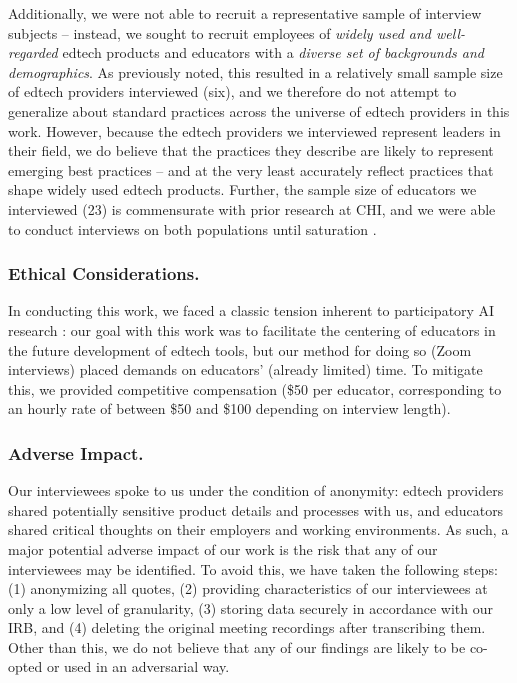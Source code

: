 Additionally, we were not able to recruit a representative sample of interview subjects -- instead, we sought to recruit employees of \textit{widely used and well-regarded} edtech products and educators with a \textit{diverse set of backgrounds and demographics}. As previously noted, this resulted in a relatively small sample size of edtech providers interviewed (six), and we therefore do not attempt to generalize about standard practices across the universe of edtech providers in this work. However, because the edtech providers we interviewed represent leaders in their field, we do believe that the practices they describe are likely to represent emerging best practices -- and at the very least accurately reflect practices that shape widely used edtech products. Further, the sample size of educators we interviewed (23) is commensurate with prior research at CHI, and we were able to conduct interviews on both populations until saturation \cite{hennink_sample_2022, small_2009_how}.

\subsubsection*{Ethical Considerations.}
In conducting this work, we faced a classic tension inherent to participatory AI research \cite{feffer_preference_2023, birhane_power_2022, sloane_participation_2022}: our goal with this work was to facilitate the centering of educators in the future development of edtech tools, but our method for doing so (Zoom interviews) placed demands on educators' (already limited) time. To mitigate this, we provided competitive compensation (\$50 per educator, corresponding to an hourly rate of between \$50 and \$100 depending on interview length).

\subsubsection*{Adverse Impact.}
Our interviewees spoke to us under the condition of anonymity: edtech providers shared potentially sensitive product details and processes with us, and educators shared critical thoughts on their employers and working environments. As such, a major potential adverse impact of our work is the risk that any of our interviewees may be identified. To avoid this, we have taken the following steps: (1) anonymizing all quotes, (2) providing characteristics of our interviewees at only a low level of granularity, (3) storing data securely in accordance with our IRB, and (4) deleting the original meeting recordings after transcribing them. Other than this, we do not believe that any of our findings are likely to be co-opted or used in an adversarial way. 


